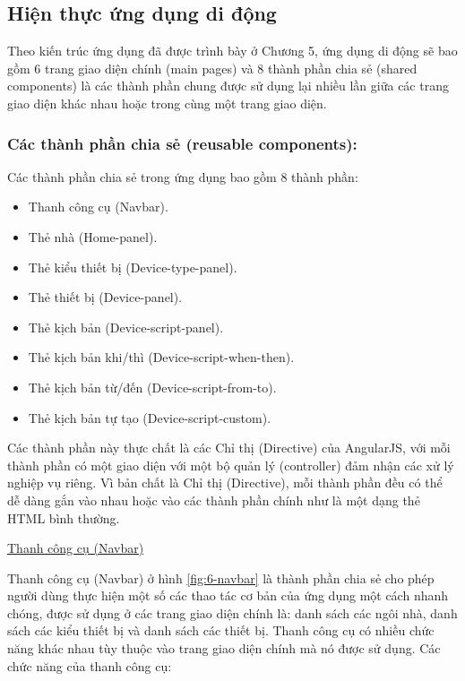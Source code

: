 \documentclass[12pt,a4paper,oneside]{extbook}
\begin{document}
\subsection{Hiện thực ứng dụng di động}
Theo kiến trúc ứng dụng đã được trình bày ở Chương 5, ứng dụng di động sẽ bao gồm 6 trang giao diện chính (main pages) và 8 thành phần chia sẻ (shared components) là các thành phần chung được sử dụng lại nhiều lần giữa các trang giao diện khác nhau hoặc trong cùng một trang giao diện.

\subsubsection{Các thành phần chia sẻ (reusable components):}

Các thành phần chia sẻ trong ứng dụng bao gồm 8 thành phần:

\begin{itemize}[topsep=1mm,itemsep=-0.5mm]
\item Thanh công cụ (Navbar).
\item Thẻ nhà (Home-panel).
\item Thẻ kiểu thiết bị (Device-type-panel).
\item Thẻ thiết bị (Device-panel).
\item Thẻ kịch bản (Device-script-panel).
\item Thẻ kịch bản khi/thì (Device-script-when-then).
\item Thẻ kịch bản từ/đến (Device-script-from-to).
\item Thẻ kịch bản tự tạo (Device-script-custom).
\vspace{1mm}
\end{itemize}

Các thành phần này thực chất là các Chỉ thị (Directive) của AngularJS, với mỗi thành phần có một giao diện với một bộ quản lý (controller) đảm nhận các xử lý nghiệp vụ riêng. Vì bản chất là Chỉ thị (Directive), mỗi thành phần đều có thể dễ dàng gắn vào nhau hoặc vào các thành phần chính như là một dạng thẻ HTML bình thường.

\underline{Thanh công cụ (Navbar)}

Thanh công cụ (Navbar) ở hình \ref{fig:6-navbar} là thành phần chia sẻ cho phép người dùng thực hiện một số các thao tác cơ bản của ứng dụng một cách nhanh chóng, được sử dụng ở các trang giao diện chính là: danh sách các ngôi nhà, danh sách các kiểu thiết bị và danh sách các thiết bị. Thanh công cụ có nhiều chức năng khác nhau tùy thuộc vào trang giao diện chính mà nó được sử dụng. Các chức năng của thanh công cụ:
\end{document}
